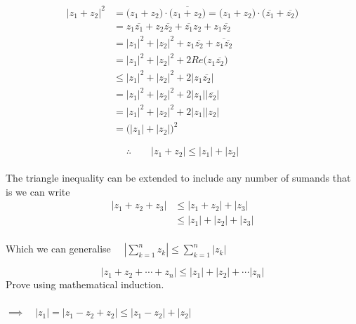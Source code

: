 \documentclass[11pt,a4paper]{article}
\theoremstyle{definition}
\begin{document}
\text{\textcolor{teal}{Proof}}
\begin{align*}
\left|z_1 + z_2\right|^2 & = \big(z_1 + z_2\big)\cdot\overline{\big(z_1 + z_2\big)}= \big(z_1 + z_2\big)\cdot\big(\overline{z_1} + \overline{z_2}\big)\\
& = z_1\overline{z_1} + z_2\overline{z_2} + \overline{z_1}z_2 + z_1\overline{z_2}\\
& = \left|z_1\right|^2 + \left|z_2\right|^2 + z_1\overline{z_2} + \overline{z_1\overline{z_2}}\\
& = \left|z_1\right|^2 + \left|z_2\right|^2 + 2 Re \big(z_1\overline{z_2}\big)\\
& \leq \left|z_1\right|^2 + \left|z_2\right|^2 + 2\left|z_1 \overline{z_2}\right|\\
& = \left|z_1\right|^2 + \left|z_2\right|^2 + 2\left|z_1\right|\left|\overline{z_2}\right|\\
& = \left|z_1\right|^2 + \left|z_2\right|^2 + 2\left|z_1\right|\left|z_2\right|\\
& = \Big(\left|z_1\right| + \left|z_2\right|\Big)^2
\end{align*}


$$\therefore \qquad  \left|z_1 + z_2\right|\leq \left|z_1\right| + \left|z_2\right|$$\\





The triangle inequality can be extended to include any number of sumands that is we can write
\begin{align*}
\left|z_1 + z_2 + z_3\right| & \leq \left|z_1 + z_2\right| + \left|z_3\right|\\
& \leq \left|z_1\right| + \left|z_2\right| + \left|z_3\right|\\
\end{align*}



Which we can generalise $\quad \left|\displaystyle{\sum^n_{k =1} z_k}\right| \leq \displaystyle{\sum^n_{k = 1} \left|z_k\right|}$ 



$$\left|z_1 + z_2 + \cdots + z_n\right| \leq \left|z_1\right| + \left|z_2\right| + \cdots\left|z_n\right|$$
Prove using mathematical induction.\\\\



$\implies\quad \left|z_1\right| = \left|z_1 - z_2 + z_2\right|\leq \left|z_1 - z_2\right| + \left|z_2\right|$\\
\end{document}
